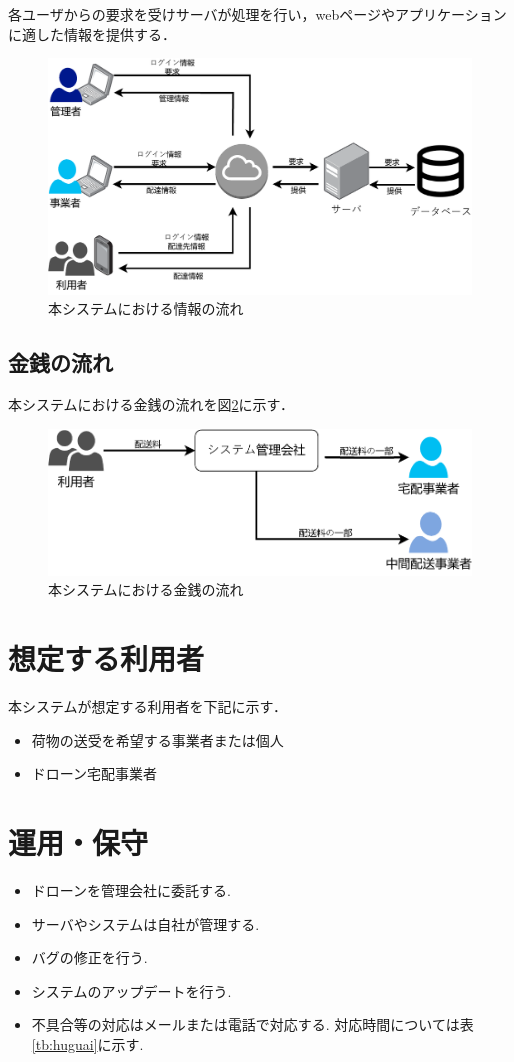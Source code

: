 \documentclass[a4paper, titlepage]{jsarticle}
\begin{document}
各ユーザからの要求を受けサーバが処理を行い，webページやアプリケーションに適した情報を提供する．

\begin{figure}[H]
        \centering
        \includegraphics[width=0.6\linewidth]{./info_flow.pdf}
        \caption{本システムにおける情報の流れ}
        \label{fig:info_flow_1}
\end{figure}

\subsection{金銭の流れ}
本システムにおける金銭の流れを図\ref{fig:money_flow_1}に示す．

\begin{figure}[H]
        \centering
        \includegraphics[width=0.6\linewidth]{./money_flow.pdf}
        \caption{本システムにおける金銭の流れ}
        \label{fig:money_flow_1}
\end{figure}


\section{想定する利用者}
本システムが想定する利用者を下記に示す．
\begin{itemize}
        \item 荷物の送受を希望する事業者または個人
        \item ドローン宅配事業者
\end{itemize}

\section{運用・保守}
\begin{itemize}
\item ドローンを管理会社に委託する.
\item サーバやシステムは自社が管理する.
\item バグの修正を行う.
\item システムのアップデートを行う.
\item 不具合等の対応はメールまたは電話で対応する. 対応時間については表\ref{tb:huguai}に示す.
\end{itemize}
\end{document}
